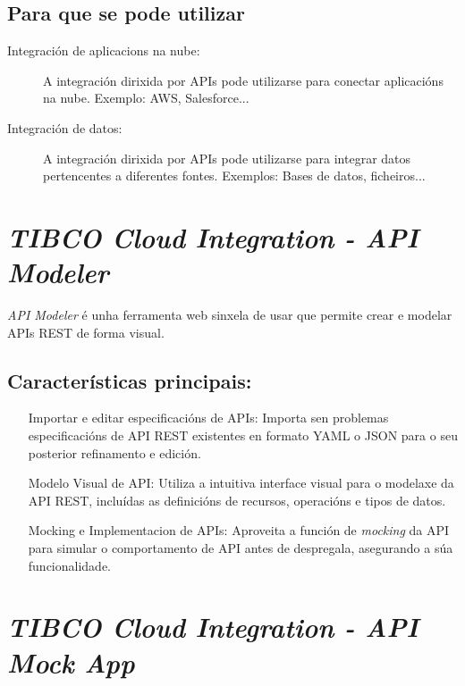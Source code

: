 \subsection{Para que se pode utilizar}

\begin{description}
    \item[Integración de aplicacions na nube:] A integración dirixida por APIs pode utilizarse para conectar aplicacións na nube. Exemplo: AWS, Salesforce...
    
    \item[Integración de datos:] A integración dirixida por APIs pode utilizarse para integrar datos pertencentes a diferentes fontes. Exemplos: Bases de datos, ficheiros...
\end{description}

\section{\textit{TIBCO Cloud Integration - API Modeler}}

\textit{API Modeler} é unha ferramenta web sinxela de usar que permite crear e modelar APIs REST de forma visual.

\subsection{Características principais:}

\begin{itemize}
    \item[Importar e editar especificacións de APIs:] Importa sen problemas especificacións de API REST existentes en formato YAML o JSON para o seu posterior refinamento e edición.
    
    \item[Modelo Visual de API:] Utiliza a intuitiva interface visual para o modelaxe da API REST, incluídas as definicións de recursos, operacións e tipos de datos.
    
    \item[Mocking e Implementacion de APIs:] Aproveita a función de \textit{mocking} da API para simular o comportamento de API antes de despregala, asegurando a súa funcionalidade.
\end{itemize}

\section{\textit{TIBCO Cloud Integration - API Mock App}}

